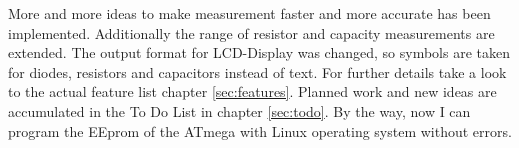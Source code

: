 More and more ideas to make measurement faster and more accurate has been implemented.
Additionally the range of resistor and capacity measurements are extended.
The output format for LCD-Display was changed, so symbols are taken for diodes, resistors and capacitors instead of text.
For further details take a look to the actual feature list chapter \ref{sec:features}.
Planned work and new ideas are accumulated in the To Do List in chapter \ref{sec:todo}.
By the way, now I can program the EEprom of the ATmega with Linux operating system without errors.


